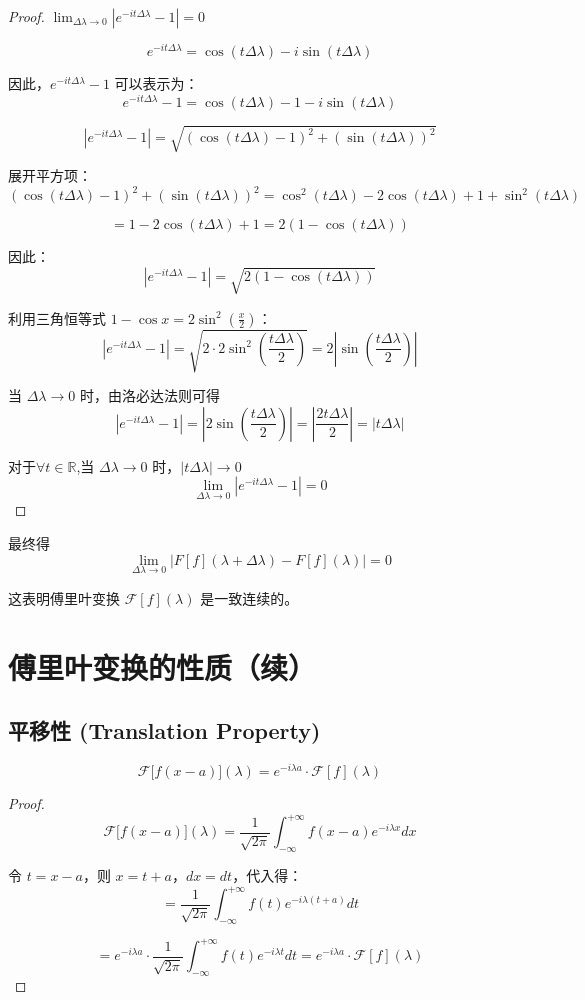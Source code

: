\documentclass[12pt,a4paper]{article}
\theoremstyle{plain}
\theoremstyle{definition}
\theoremstyle{remark}
\begin{document}
\begin{proof}	$ \lim_{\Delta \lambda \to 0} |e^{-it\Delta \lambda} - 1| = 0 $

	
	\[ e^{-it\Delta \lambda} = \cos(t \Delta \lambda) - i \sin(t \Delta \lambda) \]
	
	因此，\(e^{-it\Delta \lambda} - 1\) 可以表示为：
	\[ e^{-it\Delta \lambda} - 1 = \cos(t \Delta \lambda) - 1 - i \sin(t \Delta \lambda) \]
	
	\[ |e^{-it\Delta \lambda} - 1| = \sqrt{(\cos(t \Delta \lambda) - 1)^2 + (\sin(t \Delta \lambda))^2} \]
	
	展开平方项：
	\[ (\cos(t \Delta \lambda) - 1)^2 + (\sin(t \Delta \lambda))^2 = \cos^2(t \Delta \lambda) - 2 \cos(t \Delta \lambda) + 1 + \sin^2(t \Delta \lambda) \]
	
	\[ = 1 - 2 \cos(t \Delta \lambda) + 1 = 2(1 - \cos(t \Delta \lambda)) \]
	
	因此：
	\[ |e^{-it\Delta \lambda} - 1| = \sqrt{2(1 - \cos(t \Delta \lambda))} \]
	
	利用三角恒等式 \(1 - \cos x = 2 \sin^2\left(\frac{x}{2}\right)\)：
	\[ |e^{-it\Delta \lambda} - 1| = \sqrt{2 \cdot 2 \sin^2\left(\frac{t \Delta \lambda}{2}\right)} = 2 \left|\sin\left(\frac{t \Delta \lambda}{2}\right)\right| \]
	
	当 \(\Delta \lambda \to 0\) 时，由洛必达法则可得
	\[|e^{-it\Delta \lambda} - 1|= \left|2\sin\left(\frac{t \Delta \lambda}{2}\right)\right| = \left|\frac{2t \Delta \lambda}{2}\right|= |t \Delta \lambda| \]
	
	
	对于$\forall t\in \mathbb{R}$,当 \(\Delta \lambda \to 0\) 时，\(|t \Delta \lambda| \to 0\)
	\[ \lim_{\Delta \lambda \to 0} |e^{-it\Delta \lambda} - 1| = 0 \]
	
\end{proof}

最终得
\[ \lim_{\Delta \lambda \to 0} |F[f](\lambda + \Delta \lambda) - F[f](\lambda)| = 0 \]

这表明傅里叶变换 \(\mathcal{F}[f](\lambda)\) 是一致连续的。
	
	\section{傅里叶变换的性质（续）}
	
	\subsection{平移性 (Translation Property)}
	\[
	\mathcal{F}\big[f(x-a)\big](\lambda) = e^{-i\lambda a} \cdot \mathcal{F}[f](\lambda)
	\]
	\begin{proof}
		
		\[
		\mathcal{F}\big[f(x-a)\big](\lambda) = \frac{1}{\sqrt{2\pi}} \int_{-\infty}^{+\infty} f(x-a) e^{-i\lambda x} dx
		\]
		
		令 $t = x - a$，则 $x = t + a$，$dx = dt$，代入得：
		\[
		= \frac{1}{\sqrt{2\pi}} \int_{-\infty}^{+\infty} f(t) e^{-i\lambda (t+a)} dt
		\]
		
		\[
		= e^{-i\lambda a} \cdot \frac{1}{\sqrt{2\pi}} \int_{-\infty}^{+\infty} f(t) e^{-i\lambda t} dt = e^{-i\lambda a} \cdot \mathcal{F}[f](\lambda)
		\]
	\end{proof}
	
\end{document}
